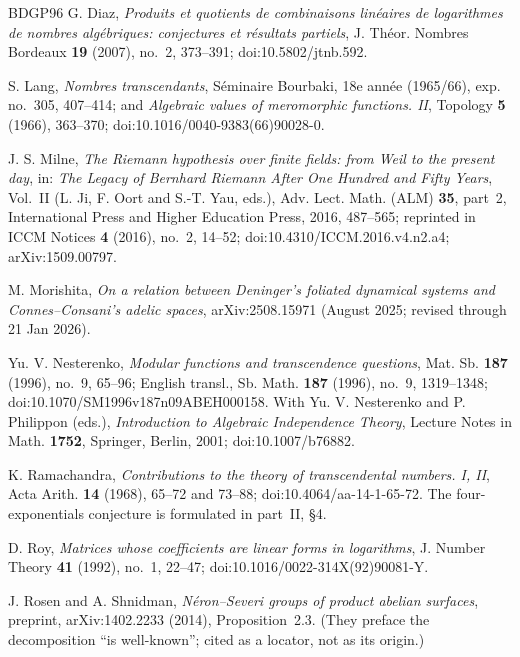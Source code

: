 \documentclass[11pt]{article}
\theoremstyle{definition}
\theoremstyle{remark}
\begin{document}
\begin{thebibliography}{BDGP96}
 G. Diaz, \emph{Produits et quotients de combinaisons
lin\'eaires de logarithmes de nombres alg\'ebriques: conjectures et
r\'esultats partiels}, J. Th\'eor. Nombres Bordeaux \textbf{19} (2007),
no.~2, 373--391; doi:10.5802/jtnb.592.

 S. Lang, \emph{Nombres transcendants}, S\'eminaire
Bourbaki, 18e ann\'ee (1965/66), exp. no.~305, 407--414; and
\emph{Algebraic values of meromorphic functions. II}, Topology \textbf{5}
(1966), 363--370; doi:10.1016/0040-9383(66)90028-0.

 J. S. Milne, \emph{The Riemann hypothesis over finite
fields: from Weil to the present day}, in: \emph{The Legacy of Bernhard
Riemann After One Hundred and Fifty Years}, Vol.~II (L. Ji, F. Oort and
S.-T. Yau, eds.), Adv. Lect. Math. (ALM) \textbf{35}, part~2, International
Press and Higher Education Press, 2016, 487--565; reprinted in ICCM Notices
\textbf{4} (2016), no.~2, 14--52; doi:10.4310/ICCM.2016.v4.n2.a4;
arXiv:1509.00797.

 M. Morishita, \emph{On a relation between Deninger's
foliated dynamical systems and Connes--Consani's adelic spaces},
arXiv:2508.15971 (August 2025; revised through 21 Jan 2026).

 Yu. V. Nesterenko, \emph{Modular functions and
transcendence questions}, Mat. Sb. \textbf{187} (1996), no.~9, 65--96;
English transl., Sb. Math. \textbf{187} (1996), no.~9, 1319--1348;
doi:10.1070/SM1996v187n09ABEH000158. With Yu. V. Nesterenko and P. Philippon
(eds.), \emph{Introduction to Algebraic Independence Theory}, Lecture Notes in
Math. \textbf{1752}, Springer, Berlin, 2001; doi:10.1007/b76882.

 K. Ramachandra, \emph{Contributions to the theory of
transcendental numbers. I, II}, Acta Arith. \textbf{14} (1968), 65--72 and
73--88; doi:10.4064/aa-14-1-65-72. The four-exponentials conjecture is
formulated in part~II, \S4.

 D. Roy, \emph{Matrices whose coefficients are linear
forms in logarithms}, J. Number Theory \textbf{41} (1992), no.~1, 22--47;
doi:10.1016/0022-314X(92)90081-Y.

 J. Rosen and A. Shnidman, \emph{N\'eron--Severi groups of
product abelian surfaces}, preprint, arXiv:1402.2233 (2014), Proposition~2.3.
(They preface the decomposition ``is well-known''; cited as a locator, not as
its origin.)


\end{thebibliography}
\end{document}
